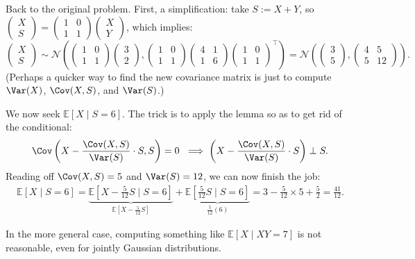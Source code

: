 \begin{solution}
    Back to the original problem.  First, a simplification:
    take $S := X + Y$, so $\begin{pmatrix} X \\ S \end{pmatrix} =
    \begin{pmatrix} 1 & 0 \\ 1 & 1 \end{pmatrix} \begin{pmatrix} X \\ Y \end{pmatrix}$,
    which implies:
    \[ \begin{pmatrix} X \\ S \end{pmatrix} \sim
    \mathcal{N}\left( \begin{pmatrix} 1 & 0 \\ 1 & 1 \end{pmatrix}
    \begin{pmatrix} 3 \\ 2 \end{pmatrix},
    \begin{pmatrix} 1 & 0 \\ 1 & 1 \end{pmatrix}
    \begin{pmatrix} 4 & 1 \\ 1 & 6 \end{pmatrix}
    \begin{pmatrix} 1 & 0 \\ 1 & 1 \end{pmatrix}^{\top}\right) =
    \mathcal{N}\left(
    \begin{pmatrix} 3 \\ 5 \end{pmatrix},
    \begin{pmatrix} 4 & 5 \\ 5 & 12 \end{pmatrix}
    \right). \]
    (Perhaps a quicker way to find the new covariance matrix
    is just to compute $\Var(X)$, $\Cov(X, S)$, and $\Var(S)$.)

    We now seek $\mathbb{E}[X \mid S = 6]$.  The trick is to apply the lemma
    so as to get rid of the conditional:
    \[ \Cov\left(X - \frac{\Cov(X, S)}{\Var(S)}\cdot S, S\right) = 0 ~ \implies
    \left(X - \frac{\Cov(X, S)}{\Var(S)} \cdot S\right) \perp S. \]
    Reading off $\Cov(X, S) = 5$ and $\Var(S) = 12$, we can now finish the job:
    \begin{align*}
    \mathbb{E}[X \mid S = 6] =
    \underbrace{\mathbb{E}\left[ X - \frac{5}{12}S \mid S = 6 \right]}_{
        \mathbb{E}\left[ X - \frac{5}{12}S \right]
    }
    + \underbrace{\mathbb{E}\left[ \frac{5}{12}S \mid S = 6 \right]}_{
        \frac{5}{12}(6)
    } =
    3 - \frac{5}{12} \times 5 + \frac{5}{2} = \frac{41}{12}.
    \end{align*}
\end{solution}

In the more general case, computing something like $\mathbb{E}[X \mid XY = 7]$
is not reasonable, even for jointly Gaussian distributions.

